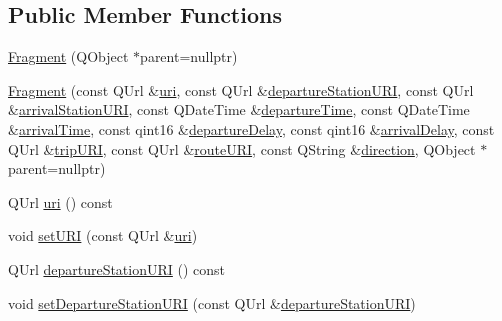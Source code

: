 \subsection*{Public Member Functions}
\begin{DoxyCompactItemize}
\item 
\mbox{\hyperlink{classFragments_1_1Fragment_a08e16b988d340a5e836c377a13e1c41d}{Fragment}} (Q\+Object $\ast$parent=nullptr)
\item 
\mbox{\hyperlink{classFragments_1_1Fragment_a26ec3793c4162b77e92498a77ae5b7dc}{Fragment}} (const Q\+Url \&\mbox{\hyperlink{classFragments_1_1Fragment_a8123bbbb75221107730898627b99ffec}{uri}}, const Q\+Url \&\mbox{\hyperlink{classFragments_1_1Fragment_aaca4de063cdd1df3f130ade1a0df8dfa}{departure\+Station\+U\+RI}}, const Q\+Url \&\mbox{\hyperlink{classFragments_1_1Fragment_a74d2fae0d687f2389121fb720f8f6505}{arrival\+Station\+U\+RI}}, const Q\+Date\+Time \&\mbox{\hyperlink{classFragments_1_1Fragment_adfcf2bb9a548f41f4ca88ad117c655a3}{departure\+Time}}, const Q\+Date\+Time \&\mbox{\hyperlink{classFragments_1_1Fragment_aa7e96d4d8b9e36c19d3f6134ff3072e9}{arrival\+Time}}, const qint16 \&\mbox{\hyperlink{classFragments_1_1Fragment_a8c8363f22d1aca339a66d342f9e5f0c8}{departure\+Delay}}, const qint16 \&\mbox{\hyperlink{classFragments_1_1Fragment_aec60f571141b0c7aacbc172e83a4a2d3}{arrival\+Delay}}, const Q\+Url \&\mbox{\hyperlink{classFragments_1_1Fragment_aa3b1beb97e501bfa8ecb2127c2729803}{trip\+U\+RI}}, const Q\+Url \&\mbox{\hyperlink{classFragments_1_1Fragment_a58ca3c71db8995b1a60b1eee17d65911}{route\+U\+RI}}, const Q\+String \&\mbox{\hyperlink{classFragments_1_1Fragment_a1c0ff28939d612a28589fdc1f47d0fd5}{direction}}, Q\+Object $\ast$parent=nullptr)
\item 
Q\+Url \mbox{\hyperlink{classFragments_1_1Fragment_a8123bbbb75221107730898627b99ffec}{uri}} () const
\item 
void \mbox{\hyperlink{classFragments_1_1Fragment_ab4ad3107834caa289cfbed904f052fc0}{set\+U\+RI}} (const Q\+Url \&\mbox{\hyperlink{classFragments_1_1Fragment_a8123bbbb75221107730898627b99ffec}{uri}})
\item 
Q\+Url \mbox{\hyperlink{classFragments_1_1Fragment_aaca4de063cdd1df3f130ade1a0df8dfa}{departure\+Station\+U\+RI}} () const
\item 
void \mbox{\hyperlink{classFragments_1_1Fragment_a8c9ffce21e97be8e50e2ca1654da507f}{set\+Departure\+Station\+U\+RI}} (const Q\+Url \&\mbox{\hyperlink{classFragments_1_1Fragment_aaca4de063cdd1df3f130ade1a0df8dfa}{departure\+Station\+U\+RI}})
\item 

\end{DoxyCompactItemize}
